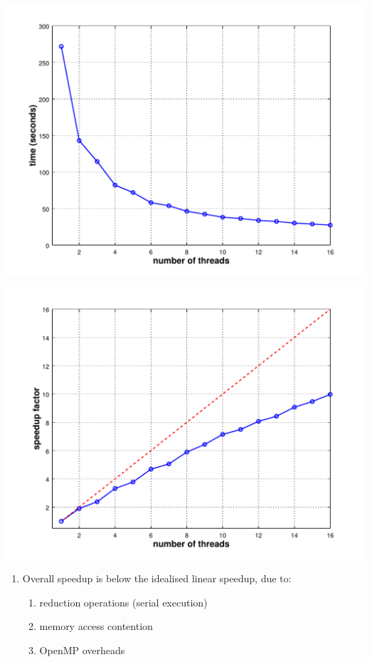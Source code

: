 \documentclass[usenames,dvipsnames]{beamer}
\begin{document}
\begin{frame}
\centering
\begin{minipage}{\textwidth}
  \centering
  \begin{minipage}{0.45\textwidth}
    \centering
    \includegraphics[width=1.1\textwidth]{plot1.pdf}
  \end{minipage}%
  \begin{minipage}{0.45\textwidth}
    \centering
    \includegraphics[width=1.1\textwidth]{plot2.pdf}
  \end{minipage}
\end{minipage}

\begin{enumerate}[{~~$\boldsymbol{\bullet}$}]

\item Overall speedup is below the idealised linear speedup, due to:


\begin{enumerate}[{$\boldsymbol{\rightarrow}$}]
\scriptsize
\item reduction operations (serial execution)
\item memory access contention
\item OpenMP overheads
\end{enumerate}

\end{enumerate}


\end{frame}
\end{document}
